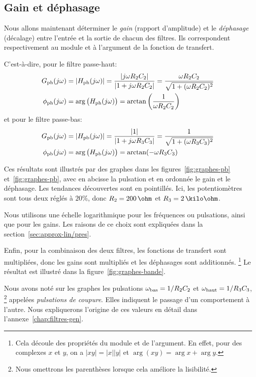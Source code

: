 \subsection{Gain et déphasage}

Nous allons maintenant déterminer
le \emph{gain} (rapport d'amplitude) et le  \emph{déphasage} (décalage)
entre l'entrée et la sortie de chacun des filtres.
Ils correspondent respectivement au module et à l'argument de la fonction de
transfert.

C'est-à-dire, pour le filtre passe-haut:
\begin{align}
    G_{\mathrm{ph}}(j\omega) &= |H_{\mathrm{ph}}(j\omega)|
    = \frac{|j\omega R_2C_2|}{|1 + j\omega R_2C_2|}
    = \frac{\omega R_2C_2}{\sqrt{1+(\omega R_2C_2)^2}}\\
    \phi_{\mathrm{ph}}(j\omega) &= \arg\big(H_{\mathrm{ph}}(j\omega)\big)
    = \arctan\left(\frac{1}{\omega R_2C_2}\right)
\end{align}
et pour le filtre passe-bas:
\begin{align}
    G_{\mathrm{pb}}(j\omega) &= |H_{\mathrm{pb}}(j\omega)|
    = \frac{|1|}{|1 + j\omega R_3C_3|}
    = \frac{1}{\sqrt{1+(\omega R_3C_3)^2}}\\
    \phi_{\mathrm{pb}}(j\omega) &= \arg\big(H_{\mathrm{pb}}(j\omega)\big)
    = \arctan(-\omega R_3C_3)
\end{align}

Ces résultats sont illustrés par des graphes dans
les figures~\ref{fig:graphes-pb} et~\ref{fig:graphes-pb},
avec en abcisse la pulsation
et en ordonnée le gain et le déphasage.
Les tendances découvertes sont en pointillés.
Ici, les potentiomètres sont tous deux réglés à $20\%$,
donc $R_2 = 200\,\ohm$ et $R_3 = 2\,\kilo\ohm$.

Nous utilisons une échelle logarithmique pour les fréquences
ou pulsations, ainsi que pour les gains.
Les raisons de ce choix sont expliquées dans
la section~\ref{sec:approx-lin/pres}.

Enfin, pour la combinaison des deux filtres,
les fonctions de transfert sont multipliées,
donc les gains sont multipliés et les déphasages sont additionnés.%
\footnote{
    Cela découle des propriétés du module et de l'argument.
    En effet, pour des complexes $x$ et $y$,
    on a $|xy| = |x||y|$ et $\arg(xy) = \arg x + \arg y$.
}
Le résultat est illustré dans la figure~\ref{fig:graphes-bande}.

Nous avons noté sur les graphes les pulsations
$\omega_{\mathrm{bas}} = 1/R_2C_2$ et $\omega_{\mathrm{haut}}=1/R_3C_3$,%
\footnote{Nous omettrons les parenthèses lorsque cela améliore la lisibilité.}
appelées \emph{pulsations de coupure}.
Elles indiquent le passage d'un comportement à l'autre.
Nous expliquerons l'origine de ces valeurs en détail dans
l'annexe~\ref{chap:filtres-gen}.
